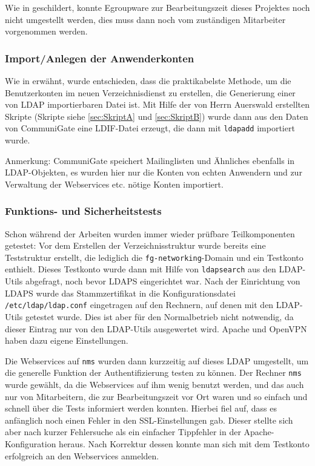 \documentclass[11pt,a4paper,titlepage=firstiscover,headsepline,bibtotoc]{scrartcl} %
\begin{document}
Wie in  geschildert, konnte Egroupware zur Bearbeitungszeit dieses Projektes noch nicht umgestellt werden, dies muss dann noch vom zuständigen Mitarbeiter vorgenommen werden.

\subsubsection{Import/Anlegen der Anwenderkonten}
Wie in  erwähnt, wurde entschieden, dass die praktikabelste Methode, um die Benutzerkonten im neuen Verzeichnisdienst zu erstellen, die Generierung einer von LDAP importierbaren Datei ist. Mit Hilfe der von Herrn Auerswald erstellten Skripte (Skripte siehe \autoref{sec:SkriptA} und \autoref{sec:SkriptB}) wurde dann aus den Daten von CommuniGate eine LDIF-Datei erzeugt, die dann mit \texttt{ldapadd} importiert wurde.

Anmerkung: CommuniGate speichert Mailinglisten und Ähnliches ebenfalls in LDAP-Objekten, es wurden hier nur die Konten von echten Anwendern und zur Verwaltung der Webservices etc. nötige Konten importiert.

\subsubsection{Funktions- und Sicherheitstests}
Schon während der Arbeiten wurden immer wieder prüfbare Teilkomponenten getestet: 
Vor dem Erstellen der Verzeichnisstruktur wurde bereits eine Teststruktur erstellt, die lediglich die \texttt{fg-networking}-Domain und ein Testkonto enthielt. Dieses Testkonto wurde dann mit Hilfe von \texttt{ldapsearch} aus den LDAP-Utils abgefragt, noch bevor LDAPS eingerichtet war. Nach der Einrichtung von LDAPS wurde das Stammzertifikat in die Konfigurationsdatei \texttt{/etc/ldap/ldap.conf} eingetragen auf den Rechnern, auf denen mit den LDAP-Utils getestet wurde. Dies ist aber für den Normalbetrieb nicht notwendig, da dieser Eintrag nur von den LDAP-Utils ausgewertet wird. Apache und OpenVPN haben dazu eigene Einstellungen.

Die Webservices auf \texttt{nms} wurden dann kurzzeitig auf dieses LDAP umgestellt, um die generelle Funktion der Authentifizierung testen zu können. Der Rechner \texttt{nms} wurde gewählt, da die Webservices auf ihm wenig benutzt werden, und das auch nur von Mitarbeitern, die zur Bearbeitungszeit vor Ort waren und so einfach und schnell über die Tests informiert werden konnten. Hierbei fiel auf, dass es anfänglich noch einen Fehler in den SSL-Einstellungen gab. Dieser stellte sich aber nach kurzer Fehlersuche als ein einfacher Tippfehler in der Apache-Konfiguration heraus. Nach Korrektur dessen konnte man sich mit dem Testkonto erfolgreich an den Webservices anmelden.
\end{document}
